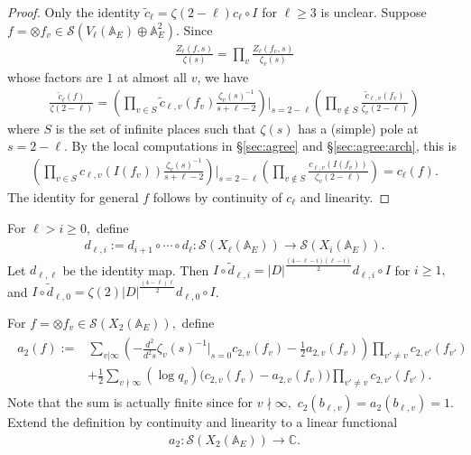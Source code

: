 \documentclass[11pt,a4paper,reqno]{amsart}
\theoremstyle{remark}
\numberwithin{equation}{section}
\newcommand{\A}{\mathbb{A}}
\newcommand{\CC}{\mathbb{C}}
\theoremstyle{definition}
\numberwithin{equation}{section}
\begin{document}
\begin{proof}
    Only the identity $\tilde{c}_{\ell}=\zeta(2-\ell)c_\ell\circ I$ for $\ell\ge 3$ is unclear. Suppose $f=\otimes f_v\in \mathcal{S}(V_\ell(\A_E)\oplus \A_E^2).$ Since
    \begin{align*}
        \frac{Z_\ell(f,s)}{\zeta(s)}=\prod_{v} \frac{Z_\ell(f_v,s)}{\zeta_v(s)}
    \end{align*}
    whose factors are $1$ at almost all $v$, we have
    \begin{align*}
        \frac{\tilde{c}_\ell(f)}{\zeta(2-\ell)}= \left(\prod_{v\in S} \tilde{c}_{\ell,v}(f_v)\frac{\zeta_v(s)^{-1}}{s+\ell-2}\right)\bigg|_{s=2-\ell}\left(\prod_{v\not\in S} \frac{\tilde{c}_{\ell,v}(f_v)}{\zeta_v(2-\ell)}\right)
    \end{align*}
    where $S$ is the set of infinite places such that $\zeta(s)$ has a (simple) pole at $s=2-\ell.$ By the local computations in \S \ref{sec:agree} and \S \ref{sec:agree:arch}, this is
    \begin{align*}
        \left(\prod_{v\in S} c_{\ell,v}(I(f_v))\frac{\zeta_v(s)^{-1}}{s+\ell-2}\right)\bigg|_{s=2-\ell}\left(\prod_{v\not\in S} \frac{c_{\ell,v}(I(f_v))}{\zeta_v(2-\ell)}\right)=c_\ell(f).
    \end{align*}
    The identity for general $f$ follows by continuity of $c_\ell$ and linearity.
\end{proof}



For $\ell>i\ge 0,$ define
\begin{align*}
    d_{\ell, i}:=d_{i+1}\circ\cdots \circ d_\ell:\mathcal{S}(X_\ell(\A_E))\longrightarrow\mathcal{S}(X_i(\A_E)).
\end{align*}
Let $d_{\ell,\ell}$ be the identity map. Then $I\circ \tilde{d}_{\ell,i}=|D|^{\frac{(4-\ell-i)(\ell-i)}{2}}d_{\ell,i}\circ I$ for $i\ge 1,$ and $I\circ \tilde{d}_{\ell,0}=\zeta(2)|D|^{\frac{(4-\ell)\ell}{2}}d_{\ell,0}\circ I$. 

For $f=\otimes f_v\in \mathcal{S}(X_{2}(\A_E)),$ define
\begin{align}\label{eq:adelica2}
\begin{split}
    a_{2}(f):=&\sum_{v|\infty} \left(-\frac{d^2}{d^2s}\zeta_v(s)^{-1}\bigg|_{s=0}c_{2,v}(f_v)-\frac{1}{2}a_{2,v}(f_v)\right)\prod_{v'\neq v} c_{2,v'}(f_{v'})\\
    &+\frac{1}{2}\sum_{v\nmid \infty} (\log q_v)\big(c_{2,v}(f_v)-a_{2,v}(f_v)\big)\prod_{v'\neq v} c_{2,v'}(f_{v'}).
\end{split}
\end{align}
Note that the sum is actually finite since for $v\nmid\infty,$ $c_2(b_{\ell,v})=a_2(b_{\ell,v})=1$. Extend the definition by continuity and linearity to a linear functional
\begin{align*}
    a_2:\mathcal{S}(X_2(\A_E))\longrightarrow \CC.
\end{align*}
\end{document}
